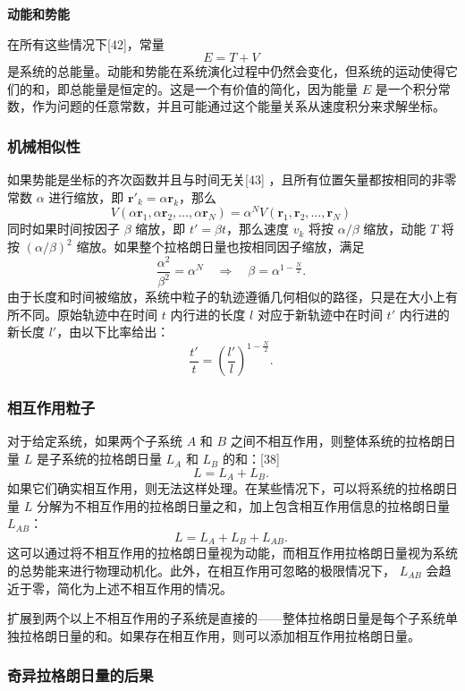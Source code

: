 \textbf{动能和势能}

在所有这些情况下[42]，常量 
\[
E = T + V~
\] 
是系统的总能量。动能和势能在系统演化过程中仍然会变化，但系统的运动使得它们的和，即总能量是恒定的。这是一个有价值的简化，因为能量 \( E \) 是一个积分常数，作为问题的任意常数，并且可能通过这个能量关系从速度积分来求解坐标。 
\subsubsection{机械相似性}

如果势能是坐标的齐次函数并且与时间无关[43] ，且所有位置矢量都按相同的非零常数 \( \alpha \) 进行缩放，即 \( \mathbf{r}'_k = \alpha \mathbf{r}_k \)，那么 
\[
V(\alpha \mathbf{r}_1, \alpha \mathbf{r}_2, \ldots, \alpha \mathbf{r}_N) = \alpha^{N} V(\mathbf{r}_1, \mathbf{r}_2, \ldots, \mathbf{r}_N)~
\] 
同时如果时间按因子 \( \beta \) 缩放，即 \( t' = \beta t \)，那么速度 \( v_k \) 将按 \( \alpha/\beta \) 缩放，动能 \( T \) 将按 \( (\alpha/\beta)^2 \) 缩放。如果整个拉格朗日量也按相同因子缩放，满足 
\[
\frac{\alpha^{2}}{\beta^{2}} = \alpha^{N} \quad \Rightarrow \quad \beta = \alpha^{1 - \frac{N}{2}}.~
\] 
由于长度和时间被缩放，系统中粒子的轨迹遵循几何相似的路径，只是在大小上有所不同。原始轨迹中在时间 \( t \) 内行进的长度 \( l \) 对应于新轨迹中在时间 \( t' \) 内行进的新长度 \( l' \)，由以下比率给出：
\[
\frac{t'}{t} = \left( \frac{l'}{l} \right)^{1 - \frac{N}{2}}.~
\]
\subsubsection{相互作用粒子}

对于给定系统，如果两个子系统 \( A \) 和 \( B \) 之间不相互作用，则整体系统的拉格朗日量 \( L \) 是子系统的拉格朗日量 \( L_A \) 和 \( L_B \) 的和：[38]
\[
L = L_{A} + L_{B}.~
\]
如果它们确实相互作用，则无法这样处理。在某些情况下，可以将系统的拉格朗日量 \( L \) 分解为不相互作用的拉格朗日量之和，加上包含相互作用信息的拉格朗日量 \( L_{AB} \)：
\[
L = L_{A} + L_{B} + L_{AB}.~
\]
这可以通过将不相互作用的拉格朗日量视为动能，而相互作用拉格朗日量视为系统的总势能来进行物理动机化。此外，在相互作用可忽略的极限情况下， \( L_{AB} \) 会趋近于零，简化为上述不相互作用的情况。

扩展到两个以上不相互作用的子系统是直接的——整体拉格朗日量是每个子系统单独拉格朗日量的和。如果存在相互作用，则可以添加相互作用拉格朗日量。 
\subsubsection{奇异拉格朗日量的后果}

